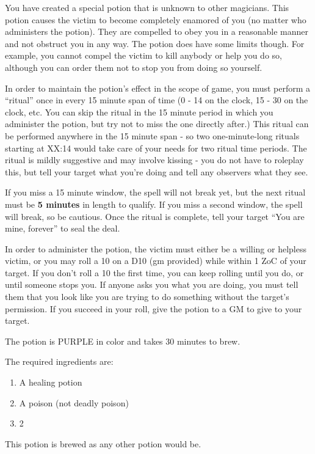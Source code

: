 \documentclass[green]{NeptuneBall}
\begin{document}
\name{\gLove{}}

You have created a special potion that is unknown to other magicians. This potion causes the victim to become completely enamored of you (no matter who administers the potion). They are compelled to obey you in a reasonable manner and not obstruct you in any way. The potion does have some limits though. For example, you cannot compel the victim to kill anybody or help you do so, although you can order them not to stop you from doing so yourself.

In order to maintain the potion's effect in the scope of game, you must perform a ``ritual'' once in every 15 minute span of time (0 - 14 on the clock, 15 - 30 on the clock, etc. You can skip the ritual in the 15 minute period in which you administer the potion, but try not to miss the one directly after.) This ritual can be performed anywhere in the 15 minute span - so two one-minute-long rituals starting at XX:14 would take care of your needs for two ritual time periods. The ritual is mildly suggestive and may involve kissing - you do not have to roleplay this, but tell your target what you're doing and tell any observers what they see.

If you miss a 15 minute window, the spell will not break yet, but the next ritual must be {\bf 5 minutes} in length to qualify. If you miss a second window, the spell will break, so be cautious. Once the ritual is complete, tell your target ``You are mine, forever'' to seal the deal.

In order to administer the potion, the victim must either be a willing or helpless victim, or you may roll a 10 on a D10 (gm provided) while within 1 ZoC of your target. If you don't roll a 10 the first time, you can keep rolling until you do, or until someone stops you. If anyone asks you what you are doing, you must tell them that you look like you are trying to do something without the target's permission. If you succeed in your roll, give the potion to a GM to give to your target.

The potion is PURPLE in color and takes 30 minutes to brew.

The required ingredients are:
\begin{enumerate}
\item A healing potion 
\item A poison (not deadly poison)
\item 2 \iPearl{}
\end{enumerate}

This potion is brewed as any other potion would be.\\
\end{document}
